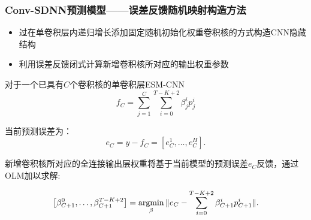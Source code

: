\begin{frame}
    \frametitle{Conv-SDNN预测模型——误差反馈随机映射构造方法}
    \begin{itemize}
        \item 过在单卷积层内递归增长添加固定随机初始化权重卷积核的方式构造CNN隐藏结构
        \item 利用误差反馈闭式计算新增卷积核所对应的输出权重参数
    \end{itemize}

    对于一个已具有$C$个卷积核的单卷积层ESM-CNN
    \begin{equation*}
        f_C= \sum^C_{j=1}\sum^{T-K+2}_{i=0} \beta_j^i p_j^i
    \end{equation*}

    当前预测误差为：
    \begin{equation*}
        e_C = y - f_C = [e_C^1,\ldots, e_C^H].
    \end{equation*}

    新增卷积核所对应的全连接输出层权重将基于当前模型的预测误差$e_C$反馈，通过OLM加以求解:

    \vspace{-1.5em}
    \begin{equation*}
        \left[\beta_{{C+1}}^0, \ldots, \beta_{{C+1}}^{T-K+2} \right]=\operatorname*{argmin} _{\beta}\|e_C -\sum_{i=0}^{T-K+2} \beta_{C+1}^i p_{C+1}^i \|.
    \end{equation*}
\end{frame}


